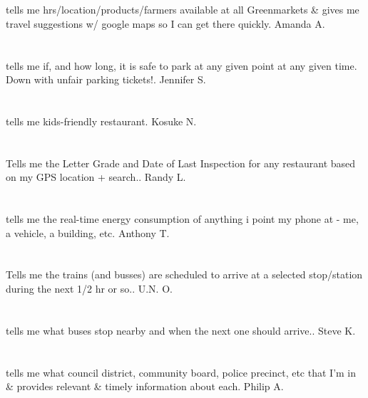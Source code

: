 \section{} tells me hrs/location/products/farmers available at all Greenmarkets \& gives me travel suggestions w/ google maps so I can get there quickly. Amanda A.
\section{} tells me if,  and how long,  it is safe to park at any given point at any given time. Down with unfair parking tickets!. Jennifer S.
\section{}tells me kids-friendly restaurant. Kosuke N.
\section{}  Tells me the Letter Grade and Date of Last Inspection for any restaurant based on my GPS location + search.. Randy L.
\section{}tells me the real-time energy consumption of anything i point my phone at - me,  a vehicle,  a building,  etc. Anthony T.
\section{} Tells me the trains (and busses) are scheduled to arrive at a selected stop/station during the next 1/2 hr or so.. U.N. O.
\section{}tells me what buses stop nearby and when the next one should arrive.. Steve K.
\section{}tells me what council district,  community board,  police precinct,  etc that I'm in \& provides relevant \& timely information about each. Philip A.
